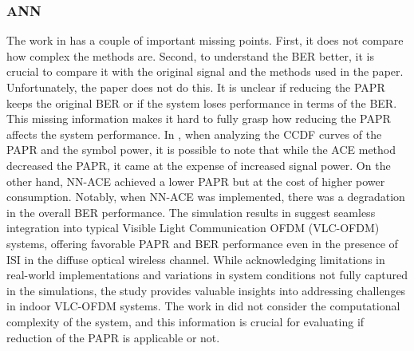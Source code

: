 \documentclass[conference]{IEEEtran}
\begin{document}
\subsubsection{ANN \cite{b135, b141, b142, b143, b144, b145, b146}}
The work in \cite{b141} has a couple of important missing points. First, it does not compare how complex the methods are. Second, to understand the BER better, it is crucial to compare it with the original signal and the methods used in the paper. Unfortunately, the paper does not do this. It is unclear if reducing the PAPR keeps the original BER or if the system loses performance in terms of the BER. This missing information makes it hard to fully grasp how reducing the PAPR affects the system performance. In \cite{b142}, when analyzing the CCDF curves of the PAPR and the symbol power, it is possible to note that while the ACE method decreased the PAPR, it came at the expense of increased signal power. On the other hand, NN-ACE achieved a lower PAPR but at the cost of higher power consumption. Notably, when NN-ACE was implemented, there was a degradation in the overall BER performance. The simulation results in \cite{b143} suggest seamless integration into typical Visible Light Communication OFDM (VLC-OFDM) systems, offering favorable PAPR and BER performance even in the presence of ISI in the diffuse optical wireless channel. While acknowledging limitations in real-world implementations and variations in system conditions not fully captured in the simulations, the study provides valuable insights into addressing challenges in indoor VLC-OFDM systems. The work in \cite{b144} did not consider the computational complexity of the system, and this information is crucial for evaluating if reduction of the PAPR is applicable or not.
\end{document}
